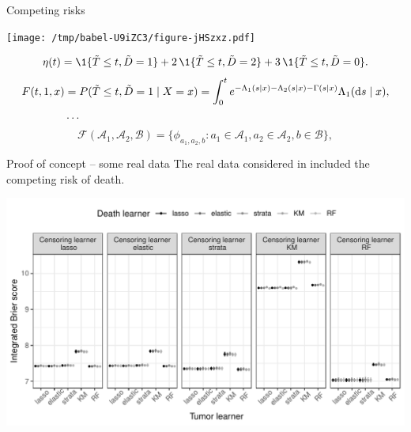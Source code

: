\documentclass[smaller]{beamer}\usepackage{listings}
\begin{document}
\begin{frame}[label={sec:orge134f36}]{Competing risks}
\small

\begin{center}
\texttt{[image: /tmp/babel-U9iZC3/figure-jHSzxz.pdf]}
\end{center}

\begin{equation*}
  \eta(t) = \1{\{\tilde{T} \leq t, \tilde{D} = 1\}} +
  2 \, \1{\{\tilde{T} \leq t, \tilde{D} = 2\}}
  +
  3 \, \1{\{\tilde{T} \leq t, \tilde{D} = 0\}}.
\end{equation*}
\begin{align*}
  F(t, 1, x)
  & = P(\tilde{T} \leq t, \tilde{D}=1 \mid X=x)
    = \int_0^t e^{-\Lambda_1(s \mid x) -\Lambda_2(s \mid x) - \Gamma(s \mid x) }  \Lambda_1(\mathop{}\!\mathrm{d} s \mid x),
  \\
  & \dots
\end{align*}
\begin{equation*}
  \mathcal{F}(\mathcal{A}_1,\mathcal{A}_2, \mathcal{B})
  = \{ \phi_{a_1, a_2, b} : a_1 \in \mathcal{A}_1, a_2 \in \mathcal{A}_2, b \in \mathcal{B}\},
\end{equation*}
\end{frame}

\begin{frame}[label={sec:org27a14ae}]{Proof of concept -- some real data}
\small The real data considered in \citep{kattan2000pretreatment} included the
competing risk of death.

\begin{center}
\includegraphics[width=1\textwidth]{./zelefski-real-data.pdf}
\end{center}
\end{frame}
\end{document}
